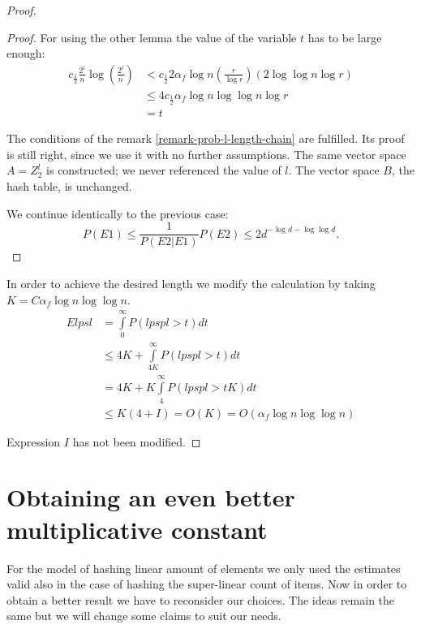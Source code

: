 \begin{proof}
\begin{proof}
For using the other lemma the value of the variable $t$ has to be large enough:
\begin{displaymath}
\begin{split}
c_{\frac{1}{2}} \frac{2^l}{n} \log \left(\frac{2^l}{n}\right) 
	& < c_{\frac{1}{2}} 2 \alpha_f \log n \left( \frac{r}{\log r} \right) \left(2 \log \log n \log r \right) \\
	& \leq 4 c_{\frac{1}{2}} \alpha_f \log n \log \log n \log r \\
	& = t
\end{split}
\end{displaymath}

The conditions of the remark \ref{remark-prob-l-length-chain} are fulfilled. Its proof is still right, since we use it with no further assumptions. The same vector space $A = Z_2^l$ is constructed; we never referenced the value of $l$. The vector space $B$, the hash table, is unchanged.

We continue identically to the previous case:
\begin{displaymath}
P(E1) \leq \frac{1}{P(E2|E1)}P(E2) \leq 2 d ^ {-\log d - \log \log d}\textit{.}
\end{displaymath}
\end{proof}

In order to achieve the desired length we modify the calculation by taking $K = C \alpha_f \log n \log \log n$.
\begin{displaymath}
\begin{split}
E lpsl 
	& = \int\limits_0^\infty P(lpspl > t) dt \\
	& \leq 4K + \int\limits_{4K}^\infty P(lpspl > t) dt \\
	& = 4K + K\int\limits_4^\infty P(lpspl > tK) dt \\
	& \leq K(4 + I) = O(K) = O(\alpha_f \log n \log \log n)
\end{split}
\end{displaymath}

Expression $I$ has not been modified.
\end{proof}

\section{Obtaining an even better multiplicative constant}
For the model of hashing linear amount of elements we only used the estimates valid also in the case of hashing the super-linear count of items. Now in order to obtain a better result we have to reconsider our choices. The ideas remain the same but we will change some claims to suit our needs.

